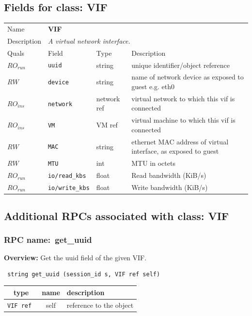 \subsection{Fields for class: VIF}
\begin{longtable}{|lllp{}|}
\hline
\multicolumn{1}{|l}{Name} & \multicolumn{3}{l|}{\bf VIF} \\
\multicolumn{1}{|l}{Description} & \multicolumn{3}{l|}{\parbox{11cm}{\em A
virtual network interface.}} \\
\hline
Quals & Field & Type & Description \\
\hline
$\mathit{RO}_\mathit{run}$ &  {\tt uuid} & string & unique identifier/object reference \\
$\mathit{RW}$ &  {\tt device} & string & name of network device as exposed to guest e.g. eth0 \\
$\mathit{RO}_\mathit{ins}$ &  {\tt network} & network ref & virtual network to which this vif is connected \\
$\mathit{RO}_\mathit{ins}$ &  {\tt VM} & VM ref & virtual machine to which this vif is connected \\
$\mathit{RW}$ &  {\tt MAC} & string & ethernet MAC address of virtual interface, as exposed to guest \\
$\mathit{RW}$ &  {\tt MTU} & int & MTU in octets \\
$\mathit{RO}_\mathit{run}$ &  {\tt io/read\_kbs} & float & Read bandwidth (KiB/s) \\
$\mathit{RO}_\mathit{run}$ &  {\tt io/write\_kbs} & float & Write bandwidth (KiB/s) \\
\hline
\end{longtable}
\subsection{Additional RPCs associated with class: VIF}
\subsubsection{RPC name:~get\_uuid}

{\bf Overview:} 
Get the uuid field of the given VIF.

\begin{verbatim} string get_uuid (session_id s, VIF ref self)\end{verbatim}



 
\vspace{0.3cm}
\begin{tabular}{|c|c|p{7cm}|}
 \hline
{\bf type} & {\bf name} & {\bf description} \\ \hline
{\tt VIF ref } & self & reference to the object \\ \hline 

\end{tabular}

